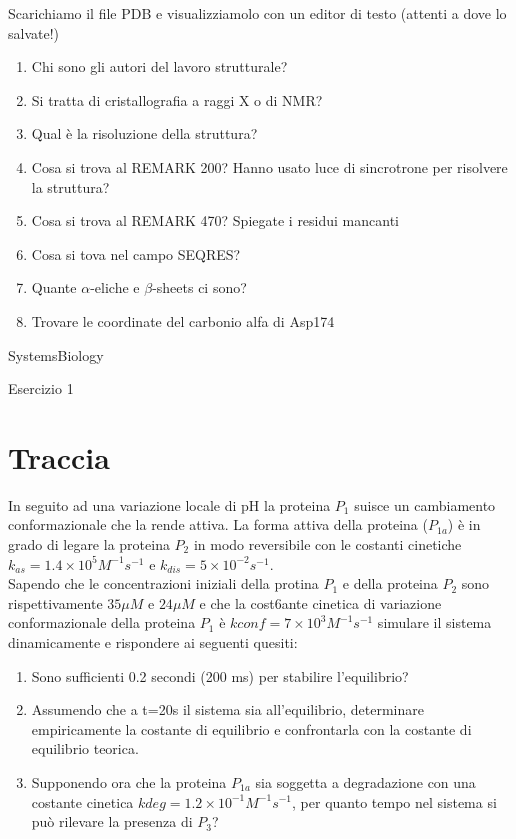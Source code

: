\documentclass{article}
\begin{document}
Scarichiamo il file PDB e visualizziamolo con un editor di testo (attenti a dove lo salvate!)

\begin{enumerate}
  \item Chi sono gli autori del lavoro strutturale?
  \item Si tratta di cristallografia a raggi X o di NMR?
  \item Qual è la risoluzione della struttura?
  \item Cosa si trova al REMARK 200? Hanno usato luce di
   sincrotrone per risolvere la struttura?
  \item Cosa si trova al REMARK 470? Spiegate i residui mancanti
  \item Cosa si tova nel campo SEQRES?
  \item Quante $\alpha$-eliche e $\beta$-sheets ci sono?
  \item Trovare le coordinate del carbonio alfa di Asp174
\end{enumerate}

\begin{center}
   \Huge
   SystemsBiology
\end{center}
\begin{center}
   \huge
   Esercizio 1
\end{center}

\section*{Traccia}
In seguito ad una variazione locale di pH la proteina $P_1$ suisce un cambiamento conformazionale che la rende attiva. La forma attiva della proteina ($P_{1a}$)
è in grado di legare la proteina $P_2$ in modo reversibile con le costanti cinetiche $k_{as} = 1.4 \times 10^5 M^{-1}s^{-1}$ e $k_{dis} = 5 \times 10^{-2}s^{-1}$.\\
Sapendo che le concentrazioni iniziali della protina $P_1$ e della proteina $P_2$ sono rispettivamente $35 \mu M$ e $24 \mu M$ e che la cost6ante cinetica di variazione conformazionale della proteina $P_1$ è $kconf = 7 \times 10^3 M^{-1}s^{-1}$
simulare il sistema dinamicamente e rispondere ai seguenti quesiti:
\begin{enumerate}
   \item Sono sufficienti 0.2 secondi (200 ms) per stabilire l'equilibrio?
   \item Assumendo che a t=20s il sistema sia all'equilibrio, determinare empiricamente la costante di equilibrio e confrontarla con la costante di equilibrio teorica.
   \item Supponendo ora che la proteina $P_{1a}$ sia soggetta a degradazione con una costante cinetica $kdeg=1.2 \times 10^{-1} M^{-1}s^{-1}$, per quanto tempo nel sistema si può rilevare la presenza di $P_3$?
\end{enumerate}
\end{document}
